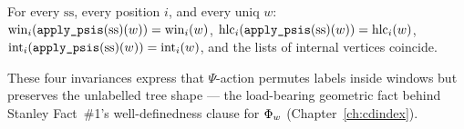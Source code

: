 \begin{lemma}
  \label{lem:shape_apply_psis}
  \rocqok
  For every $\mathrm{ss}$, every position $i$, and every uniq $w$:
  $\operatorname{win}_i(\texttt{apply\_psis}(\mathrm{ss})(w)) = \operatorname{win}_i(w)$,
  $\operatorname{hlc}_i(\texttt{apply\_psis}(\mathrm{ss})(w)) = \operatorname{hlc}_i(w)$,
  $\operatorname{int}_i(\texttt{apply\_psis}(\mathrm{ss})(w)) = \operatorname{int}_i(w)$,
  and the lists of internal vertices coincide.

  These four invariances express that $\Psi$-action permutes labels
  inside windows but preserves the unlabelled tree shape — the
  load-bearing geometric fact behind Stanley Fact~\#1's
  well-definedness clause for $\Phi_{w}$ (Chapter~\ref{ch:cdindex}).
\end{lemma}
